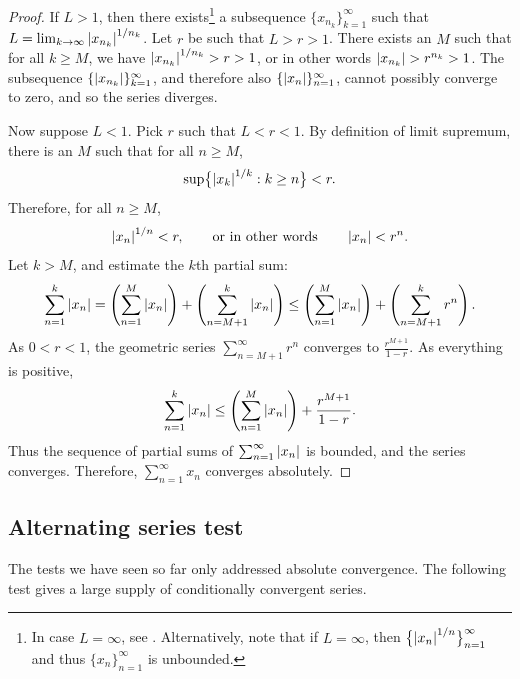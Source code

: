 \begin{proof}
If $L > 1$, then there exists\footnote{%
In case $L=\infty$, see .
Alternatively, note that if $L=\infty$, then $\bigl\{ {\lvert {x_{n}} \rvert}^{1/n}
\bigr\}_{n=1}^\infty$
and thus $\{ x_n \}_{n=1}^\infty$ is unbounded.}
a subsequence $\{ x_{n_k} \}_{k=1}^\infty$ such that
$L = \lim_{k\to\infty} {\lvert {x_{n_k}} \rvert}^{1/n_k}$.  Let
$r$ be such that $L > r > 1$.  There exists an $M$ such
that for all $k \geq M$, we have 
${\lvert {x_{n_k}} \rvert}^{1/n_k} > r > 1$, or in other words
$\lvert {x_{n_k}} \rvert > r^{n_k} > 1$.
The subsequence 
$\{ \lvert {x_{n_k}} \rvert \}_{k=1}^\infty$, and therefore also
$\{ \lvert {x_{n}} \rvert \}_{n=1}^\infty$,
cannot possibly converge to zero, and so the series diverges.

Now suppose $L < 1$.  Pick $r$ such that $L < r < 1$.
By definition of limit supremum,
there is an $M$ such that for all $n \geq M$,
\begin{equation*}
\sup \bigl\{ {\left\lvert {x_k} \right\rvert}^{1/k} : k \geq n \bigr\} < r .
\end{equation*}
Therefore, for all $n \geq M$,
\begin{equation*}
{\left\lvert {x_n} \right\rvert}^{1/n} < r , \qquad \text{or in other words} \qquad \left\lvert {x_n} \right\rvert < r^n .
\end{equation*}
Let $k > M$, and estimate the $k$th partial sum:
\begin{equation*}
\sum_{n=1}^k \left\lvert {x_n} \right\rvert = 
\left( \sum_{n=1}^M \left\lvert {x_n} \right\rvert \right) + 
\left( \sum_{n=M+1}^k \left\lvert {x_n} \right\rvert \right)
\leq
\left( \sum_{n=1}^M \left\lvert {x_n} \right\rvert \right) + 
\left( \sum_{n=M+1}^k r^n \right) .
\end{equation*}
As $0 < r < 1$,
the geometric series $\sum_{n=M+1}^\infty r^n$ converges to
$\frac{r^{M+1}}{1-r}$.  As everything is positive,
\begin{equation*}
\sum_{n=1}^k \left\lvert {x_n} \right\rvert 
\leq
\left( \sum_{n=1}^M \left\lvert {x_n} \right\rvert \right) + 
\frac{r^{M+1}}{1-r} .
\end{equation*}
Thus the sequence of partial sums of $\sum_{n=1}^\infty \left\lvert {x_n} \right\rvert$ is bounded, and
the series converges.  Therefore, $\sum_{n=1}^\infty x_n$ converges absolutely.
\end{proof}

\subsection{Alternating series test}

The tests we have seen so far only addressed absolute convergence.  The
following test gives a large supply of conditionally convergent series.

